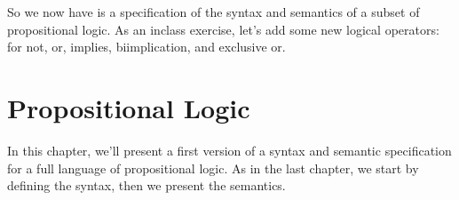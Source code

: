 \documentclass[letterpaper,10pt,english]{sphinxmanual}
\begin{document}
\begin{sphinxVerbatim}[commandchars=\\\{\}]
 


   
   
   

   
   
   

   
   
   

         
\end{sphinxVerbatim}

\sphinxAtStartPar
So we now have is a specification of the syntax and
semantics of a subset of propositional logic. As an
in\sphinxhyphen{}class exercise, let’s add some new logical operators:
for not, or, implies, bi\sphinxhyphen{}implication, and exclusive or.


\section{Propositional Logic}
\label{\detokenize{A_01_Propositional_Logic:id2}}
\sphinxAtStartPar
In this chapter, we’ll present a first
version of a syntax and semantic specification
for a full language of propositional logic. As
in the last chapter, we start by defining the
syntax, then we present the semantics.
\end{document}

